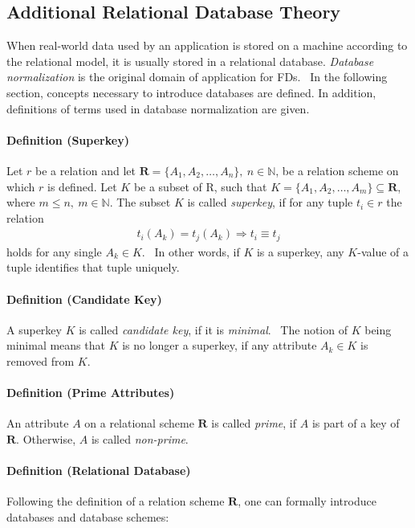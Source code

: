 \subsection{Additional Relational Database Theory}
When real-world data used by an application is stored on a machine according to the relational model, it is usually stored in a relational database.
\emph{Database normalization} is the original domain of application for FDs.~\cite[p.~381]{COD70}
In the following section, concepts necessary to introduce databases are defined.
In addition, definitions of terms used in database normalization are given.

\paragraph{Definition (Superkey)}Let \( r \) be a relation and let \( \boldsymbol{R} = \{ A_1, A_2, \dots, A_n \},~n \in \mathbb{N} \), be a relation scheme on which \( r \) is defined.
Let \( K \) be a subset of R, such that \(K = \{ A_1, A_2, \dots, A_m \} \subseteq \boldsymbol{R} \), where \( m \leq n,~m \in \mathbb{N} \).
The subset \( K \) is called \emph{superkey}, if for any tuple \( t_i \in r \) the relation
\begin{align*}
    t_i(A_k) = t_j(A_k) \Rightarrow t_i \equiv t_j
\end{align*}
holds for any single \( A_k \in K \).~\cite[p.~4]{MAI83}
In other words, if \( K \) is a superkey, any \( K \)-value of a tuple identifies that tuple uniquely.~\cite[p.~32]{SCH17}

\paragraph{Definition (Candidate Key)} A superkey \( K \) is called \emph{candidate key}, if it is \emph{minimal}.~\cite[p.~32]{SCH17}
The notion of \( K \) being minimal means that \( K \) is no longer a superkey, if any attribute \( A_k \in K \) is removed from \( K \).

\paragraph{Definition (Prime Attributes)} An attribute \( A \) on a relational scheme \( \boldsymbol{R} \) is called \emph{prime}, if \( A \) is part of a key of \( \boldsymbol{R} \).
Otherwise, \( A \) is called \emph{non-prime}.

\paragraph{Definition (Relational Database)}
Following the definition of a relation scheme \( \boldsymbol{R} \), one can formally introduce databases and database schemes:

